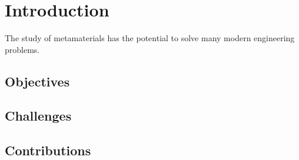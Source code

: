 \chapter{Introduction}
The study of metamaterials has the potential to solve many modern engineering problems.
\section{Objectives}
\section{Challenges}
\section{Contributions}
